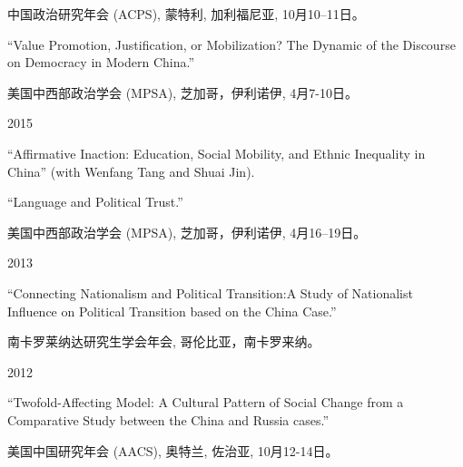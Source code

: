 \documentclass[10.5pt,]{article}
\providecommand{\tightlist}{%
	\setlength{\itemsep}{0pt}\setlength{\parskip}{0pt}}
\renewenvironment{itemize}{
	\begin{list}{}{
			\setlength{\leftmargin}{1.5em}
		}
	}{
	\end{list}
}
\begin{document}
\begin{itemize}
\begin{itemize}
     \begin{itemize}
     \tightlist
     \item
       \footnotesize 中国政治研究年会 (ACPS), 蒙特利, 加利福尼亚,
       10月10--11日。
     \end{itemize}
   \item
     ``Value Promotion, Justification, or Mobilization? The Dynamic of
     the Discourse on Democracy in Modern China.''

     \begin{itemize}
     \tightlist
     \item
       \footnotesize 美国中西部政治学会 (MPSA), 芝加哥，伊利诺伊,
       4月7-10日。
     \end{itemize}
   \end{itemize}
 \item
   2015

   \begin{itemize}
   \tightlist
   \item
     ``Affirmative Inaction: Education, Social Mobility, and Ethnic
     Inequality in China'' (with Wenfang Tang and Shuai Jin).
   \item
     ``Language and Political Trust.''

     \begin{itemize}
     \tightlist
     \item
       \footnotesize 美国中西部政治学会 (MPSA), 芝加哥，伊利诺伊,
       4月16--19日。
     \end{itemize}
   \end{itemize}
 \item
   2013

   \begin{itemize}
   \tightlist
   \item
     ``Connecting Nationalism and Political Transition:A Study of
     Nationalist Influence on Political Transition based on the China
     Case.''

     \begin{itemize}
     \tightlist
     \item
       \footnotesize 南卡罗莱纳达研究生学会年会, 哥伦比亚，南卡罗来纳。
     \end{itemize}
   \end{itemize}
 \item
   2012

   \begin{itemize}
   \tightlist
   \item
     ``Twofold-Affecting Model: A Cultural Pattern of Social Change from
     a Comparative Study between the China and Russia cases.''

     \begin{itemize}
     \tightlist
     \item
       \footnotesize 美国中国研究年会 (AACS), 奥特兰, 佐治亚,
       10月12-14日。
     \end{itemize}
   \end{itemize}
 \end{itemize}
\end{document}
